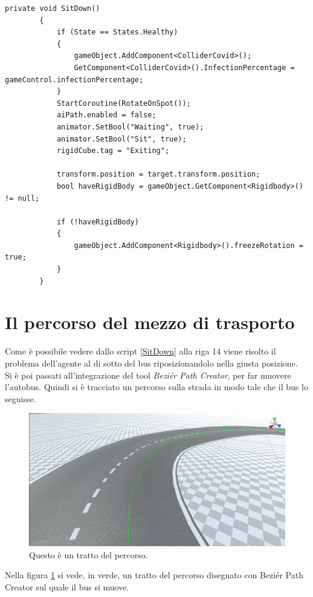 \documentclass[12pt, openany]{book}
\begin{document}
	\begin{lstlisting}[language={[Sharp]C}, caption={Metodo per la seduta degli agenti}, label={SitDown}]
		private void SitDown()
		{
			if (State == States.Healthy)
			{
				gameObject.AddComponent<ColliderCovid>();
				GetComponent<ColliderCovid>().InfectionPercentage = 	gameControl.infectionPercentage;
			}
			StartCoroutine(RotateOnSpot());
			aiPath.enabled = false;
			animator.SetBool("Waiting", true);
			animator.SetBool("Sit", true);
			rigidCube.tag = "Exiting";
			
			transform.position = target.transform.position;
			bool haveRigidBody = gameObject.GetComponent<Rigidbody>() != null;
			
			if (!haveRigidBody)
			{
				gameObject.AddComponent<Rigidbody>().freezeRotation = true;
			}
		}
	\end{lstlisting}
	\section{Il percorso del mezzo di trasporto}
	Come è possibile vedere dallo script \ref{SitDown} alla riga 14 viene risolto il problema dell'agente al di sotto del bus riposizionandolo nella giusta posizione.\\
	Si è poi passati all'integrazione del tool \emph{Beziér Path Creator}, per far muovere l'autobus. Quindi si è tracciato un percorso sulla strada in modo tale che il bus lo seguisse.
	\begin{figure}[H]
		\centering
		\includegraphics[width=1\linewidth]{"Immagini/BezierPath.png"}
		\caption{Questo è un tratto del percorso.}
		\label{fig:BezierPath}
	\end{figure}
	Nella figura \ref{fig:BezierPath} si vede, in verde, un tratto del percorso disegnato con Beziér Path Creator sul quale il bus si muove.\\
\end{document}
